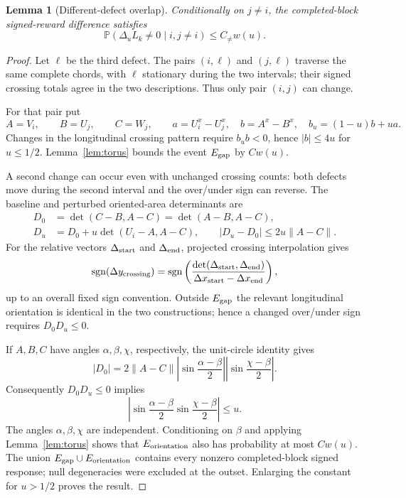 \documentclass[11pt]{article}
\newtheorem{lemma}[theorem]{Lemma}
\theoremstyle{remark}\newtheorem{remark}[theorem]{Remark}
\newcommand{\Prb}{\mathbb P}
\begin{document}
\begin{lemma}[Different-defect overlap]\label{lem:other}
Conditionally on $j\ne i$, the completed-block signed-reward difference satisfies
\[\Prb(\Delta_u L_k\ne0\mid i,j\ne i)\le C_{\ne}w(u).\]
\end{lemma}
\begin{proof}
Let $\ell$ be the third defect. The pairs $(i,\ell)$ and $(j,\ell)$ traverse the same complete chords, with $\ell$ stationary during the two intervals; their signed crossing totals agree in the two descriptions. Thus only pair $(i,j)$ can change.

For that pair put
\[A=V_i,\qquad B=U_j,\qquad C=W_j,\qquad a=U_i^x-U_j^x,\quad b=A^x-B^x,\quad b_u=(1-u)b+ua.\]
Changes in the longitudinal crossing pattern require $b_ub<0$, hence $|b|\le4u$ for $u\le1/2$. Lemma~\ref{lem:torus} bounds the event $E_{\rm gap}$ by $Cw(u)$.

A second change can occur even with unchanged crossing counts: both defects move during the second interval and the over/under sign can reverse. The baseline and perturbed oriented-area determinants are
\begin{align}\label{eq:Ddet}
D_0&=\det(C-B,A-C)=\det(A-B,A-C),\\
D_u&=D_0+u\det(U_i-A,A-C),\qquad |D_u-D_0|\le2u\|A-C\|.
\end{align}
For the relative vectors $\Delta_{\rm start}$ and $\Delta_{\rm end}$, projected crossing interpolation gives
\[
\operatorname{sgn}(\Delta y_{\rm crossing})
=\operatorname{sgn}\left(
\frac{\det(\Delta_{\rm start},\Delta_{\rm end})}
{\Delta x_{\rm start}-\Delta x_{\rm end}}
\right),
\]
up to an overall fixed sign convention. Outside $E_{\rm gap}$ the relevant longitudinal orientation is identical in the two constructions; hence a changed over/under sign requires $D_0D_u\le0$.

If $A,B,C$ have angles $\alpha,\beta,\chi$, respectively, the unit-circle identity gives
\begin{equation}\label{eq:detproduct}
|D_0|=2\|A-C\|\left|\sin\frac{\alpha-\beta}{2}\right|\left|\sin\frac{\chi-\beta}{2}\right|.
\end{equation}
Consequently $D_0D_u\le0$ implies
\[\left|\sin\frac{\alpha-\beta}{2}\sin\frac{\chi-\beta}{2}\right|\le u.\]
The angles $\alpha,\beta,\chi$ are independent. Conditioning on $\beta$ and applying Lemma~\ref{lem:torus} shows that $E_{\rm orientation}$ also has probability at most $Cw(u)$. The union $E_{\rm gap}\cup E_{\rm orientation}$ contains every nonzero completed-block signed response; null degeneracies were excluded at the outset. Enlarging the constant for $u>1/2$ proves the result.
\end{proof}
\end{document}

